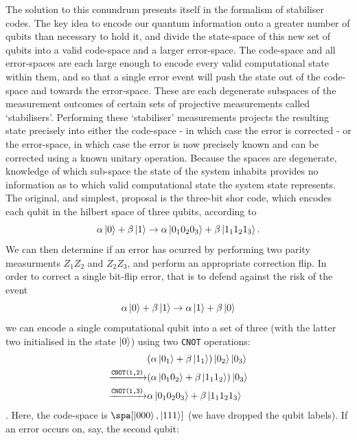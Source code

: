 \documentclass{report}
\begin{document}
The solution to this conundrum presents itself in the formalism of stabiliser codes. The key idea to encode our quantum information onto a greater number of qubits than necessary to hold it, and divide the state-space of this new set of qubits into a valid code-space and a larger error-space. The code-space and all error-spaces are each large enough to encode every valid computational state within them, and so that a single error event will push the state out of the code-space and towards the error-space. These are each degenerate subspaces of the measurement outcomes of certain sets of projective measurements called `stabilisers'. Performing these `stabiliser' measurements projects the resulting state precisely into either the code-space - in which case the error is corrected - or the error-space, in which case the error is now precisely known and can be corrected using a known unitary operation. Because the spaces are degenerate, knowledge of which sub-space the state of the system inhabits provides no information as to which valid computational state the system state represents. The original, and simplest, proposal is the three-bit shor code, which encodes each qubit in the hilbert space of three qubits, according to
\begin{equation*}
    \alpha\ket{0} + \beta\ket{1} \rightarrow \alpha\ket{0_10_20_3} + \beta\ket{1_11_21_3}.
\end{equation*} We can then determine if an error has ocurred by performing two parity measurments $Z_1Z_2$ and $Z_2Z_3$, and perform an appropriate correction flip. In order to correct a single bit-flip error, that is to defend against the risk of the event
\begin{equation*}
    \alpha\ket{0} + \beta\ket{1} \rightarrow \alpha\ket{1} + \beta\ket{0}
\end{equation*}
we can encode a single computational qubit into a set of three (with the latter two initialised in the state $\ket{0}$) using two \texttt{CNOT} operations:
\begin{equation*}
\begin{aligned}
    & (\alpha\ket{0_1} + \beta\ket{1_1})\ket{0_2}\ket{0_3}\\
      \xrightarrow{\texttt{CNOT(1,2)}} &(\alpha\ket{0_1 0_2} + \beta\ket{1_1 1_2})\ket{0_3} \\
     \xrightarrow{\texttt{CNOT(1,3)}}  &\alpha\ket{0_1 0_2 0_3} + \beta\ket{1_1 1_2 1_3}
\end{aligned}
\end{equation*}
. Here, the code-space is $\spa[\ket{0 0 0}, \ket{1 1 1}]$ (we have dropped the qubit labels). If an error occurs on, say, the second qubit:
\end{document}
